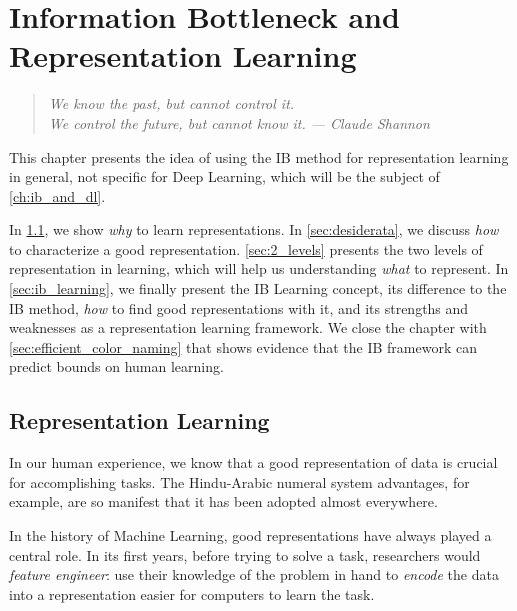 \chapter{Information Bottleneck and Representation Learning}\label{ch:ib_and_rl}

\begin{quotation}
	\small \textit{ \flushright
	We know the past, but cannot control it.\\
	We control the future, but cannot know it.
	\flushright --- Claude Shannon\\
	\vspace{1cm}}
\end{quotation}


This chapter presents the idea of using the \acf{IB} method for representation learning in general, not specific for Deep Learning, which will be the subject of \cref{ch:ib_and_dl}.

In \cref{sec:why_representation_learning}, we show \emph{why} to learn representations. In \cref{sec:desiderata}, we discuss \emph{how} to characterize a good representation. \cref{sec:2_levels} presents the two levels of representation in learning, which will help us understanding \emph{what} to represent. In \cref{sec:ib_learning}, we finally present the IB Learning concept, its difference to the IB method,  \emph{how} to find good representations with it, and its strengths and weaknesses as a representation learning framework. We close the chapter with \cref{sec:efficient_color_naming} that shows evidence that the IB framework can predict bounds on human learning.




\section{Representation Learning}\label{sec:why_representation_learning}
In our human experience, we know that a good representation of data is crucial for accomplishing tasks. The Hindu-Arabic numeral system advantages, for example, are so manifest that it has been adopted almost everywhere.

In the history of Machine Learning, good representations have always played a central role. In its first years, before trying to solve a task, researchers would \emph{feature engineer}: use their knowledge of the problem in hand to \emph{encode} the data into a representation easier for computers to learn the task.

